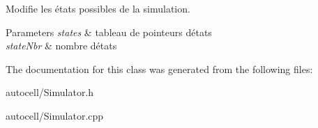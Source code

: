 Modifie les états possibles de la simulation. 


\begin{DoxyParams}{Parameters}
{\em states} & tableau de pointeurs d\textquotesingle{}états \\
\hline
{\em state\+Nbr} & nombre d\textquotesingle{}états \\
\hline
\end{DoxyParams}


The documentation for this class was generated from the following files\+:\begin{DoxyCompactItemize}
\item 
autocell/Simulator.\+h\item 
autocell/Simulator.\+cpp\end{DoxyCompactItemize}
